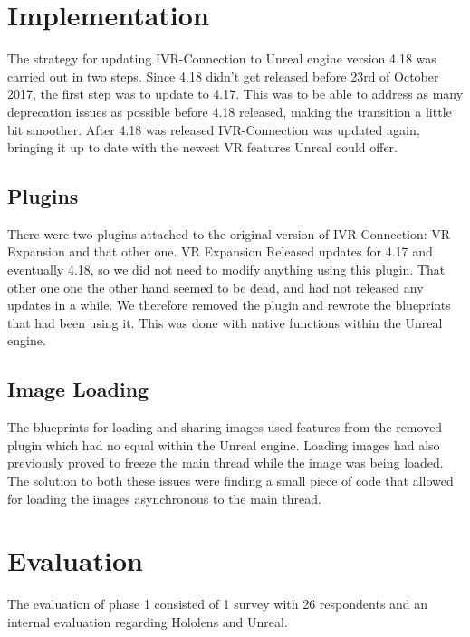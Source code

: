     \section{Implementation} %
    The strategy for updating IVR-Connection to Unreal engine version 4.18 was carried out in two steps. Since 4.18 didn't get released before 23rd of October 2017, the first step was to update to 4.17. This was to be able to address as many deprecation issues as possible before 4.18 released, making the transition a little bit smoother. After 4.18 was released IVR-Connection was updated again, bringing it up to date with the newest VR features Unreal could offer. %
        
        \subsection{Plugins}
        There were two plugins attached to the original version of IVR-Connection: VR Expansion and that other one. VR Expansion Released updates for 4.17 and eventually 4.18, so we did not need to modify anything using this plugin. That other one one the other hand seemed to be dead, and had not released any updates in a while. We therefore removed the plugin and rewrote the blueprints that had been using it. This was done with native functions within the Unreal engine. %
        
        \subsection{Image Loading}
        The blueprints for loading and sharing images used features from the removed plugin which had no equal within the Unreal engine. Loading images had also previously proved to freeze the main thread while the image was being loaded. The solution to both these issues were finding a small piece of code that allowed for loading the images asynchronous to the main thread. %
    
    
    \section{Evaluation} %
    The evaluation of phase 1 consisted of 1 survey with 26 respondents and an internal evaluation regarding Hololens and Unreal.
    

